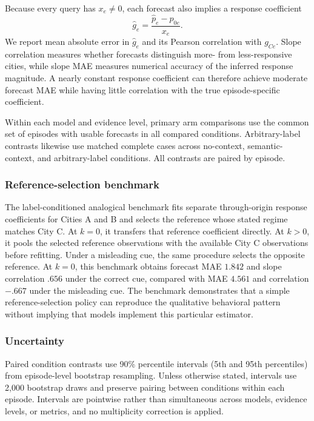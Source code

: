 Because every query has \(x_e\neq0\), each forecast also implies a response coefficient
\[
\widehat g_e
=
\frac{\widehat p_e-p_{0e}}{x_e}.
\]
We report mean absolute error in \(\widehat g_e\) and its Pearson correlation with \(g_{Ce}\).
Slope correlation measures whether forecasts distinguish more- from less-responsive cities, while slope MAE measures numerical accuracy of the inferred response magnitude.
A nearly constant response coefficient can therefore achieve moderate forecast MAE while having little correlation with the true episode-specific coefficient.

Within each model and evidence level, primary arm comparisons use the common set of episodes with usable forecasts in all compared conditions.
Arbitrary-label contrasts likewise use matched complete cases across no-context, semantic-context, and arbitrary-label conditions.
All contrasts are paired by episode.

\subsubsection{Reference-selection benchmark}

The label-conditioned analogical benchmark fits separate through-origin response coefficients for Cities A and B and selects the reference whose stated regime matches City C.
At \(k=0\), it transfers that reference coefficient directly.
At \(k>0\), it pools the selected reference observations with the available City C observations before refitting.
Under a misleading cue, the same procedure selects the opposite reference.
At \(k=0\), this benchmark obtains forecast MAE \(1.842\) and slope correlation \(.656\) under the correct cue, compared with MAE \(4.561\) and correlation \(-.667\) under the misleading cue.
The benchmark demonstrates that a simple reference-selection policy can reproduce the qualitative behavioral pattern without implying that models implement this particular estimator.

\subsubsection{Uncertainty}

Paired condition contrasts use 90\% percentile intervals (5th and 95th percentiles) from episode-level bootstrap resampling.
Unless otherwise stated, intervals use 2,000 bootstrap draws and preserve pairing between conditions within each episode.
Intervals are pointwise rather than simultaneous across models, evidence levels, or metrics, and no multiplicity correction is applied.

